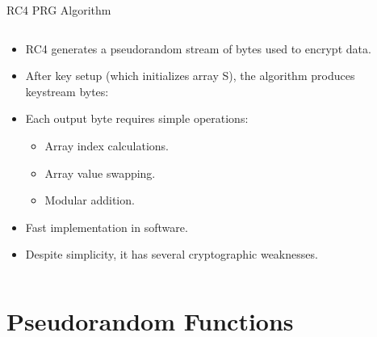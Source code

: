 \documentclass[aspectratio=169, lualatex, handout]{beamer}
\begin{document}
\begin{frame}[fragile]{RC4 PRG Algorithm}
	\begin{columns}[c]
		\begin{column}{0.55\textwidth}
			\begin{itemize}[<+->]
				\item RC4 generates a pseudorandom stream of bytes used to encrypt data.
				\item After key setup (which initializes array S), the algorithm produces keystream bytes:
				\item Each output byte requires simple operations:
				      \begin{itemize}[<+->]
					      \item Array index calculations.
					      \item Array value swapping.
					      \item Modular addition.
				      \end{itemize}
				\item Fast implementation in software.
				\item Despite simplicity, it has several cryptographic weaknesses.
			\end{itemize}
		\end{column}
		\begin{column}{0.45\textwidth}
		\end{column}
	\end{columns}
\end{frame}

\section{Pseudorandom Functions}
\end{document}
